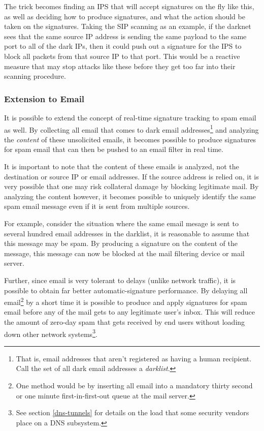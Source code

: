 \documentclass{article}
\theoremstyle{remark}
\theoremstyle{definition}
\theoremstyle{definition}
\theoremstyle{definition}
\begin{document}
The trick becomes finding an IPS that will accept signatures on the fly like this, as well as deciding how to produce signatures, and what the action should be taken on the signatures. Taking the SIP scanning as an example, if the darknet sees that the same source IP address is sending the same payload to the same port to all of the dark IPs, then it could push out a signature for the IPS to block all packets from that source IP to that port. This would be a reactive measure that may stop attacks like these before they get too far into their scanning procedure.

\subsubsection{Extension to Email}
It is possible to extend the concept of real-time signature tracking to spam email as well. By collecting all email that comes to dark email addresses\footnote{That is, email addresses that aren't registered as having a human recipient. Call the set of all dark email addresses a \emph{darklist}.} and analyzing the \emph{content} of these unsolicited emails, it becomes possible to produce signatures for spam email that can then be pushed to an email filter in real time.

It is important to note that the content of these emails is analyzed, not the destination or source IP or email addresses. If the source address is relied on, it is very possible that one may risk collateral damage by blocking legitimate mail. By analyzing the content however, it becomes possible to uniquely identify the same spam email message even if it is sent from multiple sources.

For example, consider the situation where the same email mesage is sent to several hundred email addresses in the darklist, it is reasonable to assume that this message may be spam. By producing a signature on the content of the message, this message can now be blocked at the mail filtering device or mail server.

Further, since email is very tolerant to delays (unlike network traffic), it is possible to obtain far better automatic-signature performance. By delaying all email\footnote{One method would be by inserting all email into a mandatory thirty second or one minute first-in-first-out queue at the mail server.} by a short time it is possible to produce and apply signatures for spam email before any of the mail gets to any legitimate user's inbox. This will reduce the amount of zero-day spam that gets received by end users without loading down other network systems\footnote{See section \ref{dns-tunnels} for details on the load that some security vendors place on a DNS subsystem.}.
\end{document}
